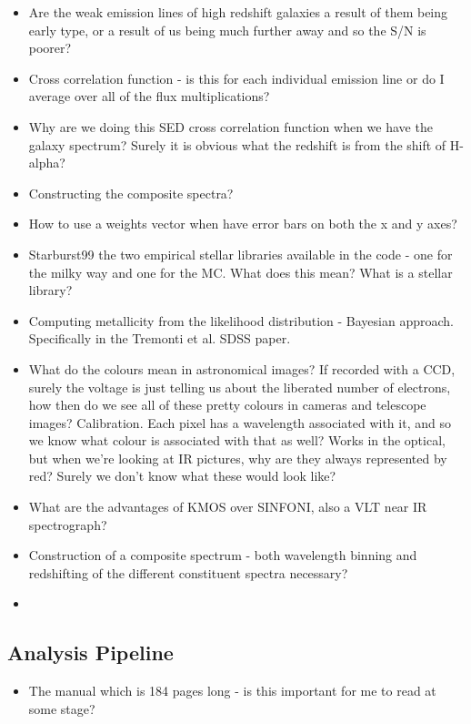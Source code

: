 \documentclass{literature}
\begin{document}
\begin{itemize}
	\item Are the weak emission lines of high redshift galaxies a result of them being early type, or a result of us being much further away and so the S/N is poorer? 
	\item Cross correlation function - is this for each individual emission line or do I average over all of the flux multiplications?
	\item Why are we doing this SED cross correlation function when we have the galaxy spectrum? Surely it is obvious what the redshift is from the shift of H-alpha?
	\item Constructing the composite spectra?
	\item How to use a weights vector when have error bars on both the x and y axes? 
	\item Starburst99 the two empirical stellar libraries available in the code - one for the milky way and one for the MC. What does this mean? What is a stellar library?
	\item Computing metallicity from the likelihood distribution - Bayesian approach. Specifically in the Tremonti et al. SDSS paper.
	\item What do the colours mean in astronomical images? If recorded with a CCD, surely the voltage is just telling us about the liberated number of electrons, how then do we see all of these pretty colours in cameras and telescope images? Calibration. Each pixel has a wavelength associated with it, and so we know what colour is associated with that as well? Works in the optical, but when we're looking at IR pictures, why are they always represented by red? Surely we don't know what these would look like? 
	\item What are the advantages of KMOS over SINFONI, also a VLT near IR spectrograph?
	\item Construction of a composite spectrum - both wavelength binning and redshifting of the different constituent spectra necessary?
	\item 

\end{itemize}

\subsection{Analysis Pipeline}\label{que:analysis_pipeline}
\begin{itemize}
	\item The manual which is 184 pages long - is this important for me to read at some stage?
\end{itemize}


\clearpage 


\end{document}
